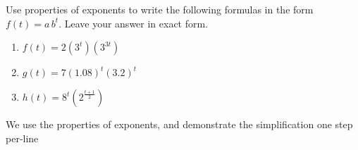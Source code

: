 \begin{pccexample}
	Use properties of exponents to write the following formulas in the 
	form $f(t)=a\,b^t$. Leave your answer in exact form. 
	\begin{multicols}{3}
		\begin{enumerate}
			\item $f(t)  = 2\left(3^t\right)\left(3^{3t}\right) $
			\item $g(t)  = 7(1.08)^t(3.2)^t $
			\item $h(t)  = 8^t\left(2^{\frac{t+1}{2}}\right)$
		\end{enumerate}
	\end{multicols}
	\begin{pccsolution}
		We use the properties of exponents, and demonstrate the simplification one step per-line
\end{pccsolution}
\end{pccexample}
